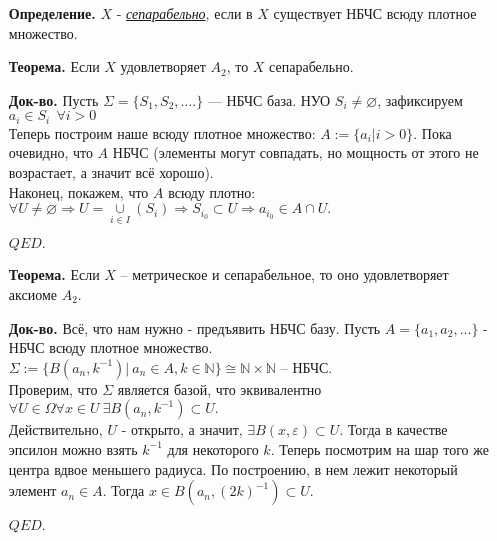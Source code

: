 \documentclass[10pt]{report}
\begin{document}
\begin{spacing}{1.5}
\begin{enumerate}
\begin{enumerate}
\end{enumerate}
\item[\textbf{Определение.}] $X$ - \emph{\underline{сепарабельно}}, если в $X$ существует НБЧС всюду плотное множество.
\item[\textbf{Теорема.}] Если $X$ удовлетворяет $A_{2}$, то $X$ сепарабельно.
\item[\textbf{Док-во.}] Пусть $\Sigma=\lbrace S_{1}, S_{2},....\rbrace $ --- НБЧС база. НУО $S_{i}\neq \varnothing$, зафиксируем $a_{i}\in S_{i}~~\forall i>0$\\
Теперь построим наше всюду плотное множество: $A:=\lbrace a_{i}|i>0\rbrace$. Пока очевидно, что $A$ НБЧС (элементы могут совпадать, но мощность от этого не возрастает, а значит всё хорошо).\\
Наконец, покажем, что $A$ всюду плотно:\\
$\forall U\neq\varnothing\Longrightarrow U=\underset{i\in I}{\cup}(S_{i})\Longrightarrow S_{i_{0}}\subset U\Rightarrow a_{i_{0}}\in A\cap U.$
\begin{flushright}
$QED.$
\end{flushright}
\item[\textbf{Теорема.}] Если $X$ -- метрическое и сепарабельное, то оно удовлетворяет аксиоме $A_{2}.$
\item[\textbf{Док-во.}] Всё, что нам нужно - предъявить НБЧС базу. Пусть $A=\lbrace a_{1}, a_{2},...\rbrace$ - НБЧС всюду плотное множество. \\
$\Sigma:=\lbrace B(a_{n}, k^{-1})|~ a_{n}\in A, k\in\mathbb{N}\rbrace\cong \mathbb{N\times N}$ -- НБЧС.\\
Проверим, что $\Sigma$ является базой, что эквивалентно $\forall U\in\Omega\forall x\in U~\exists B(a_{n}, k^{-1})\subset U. $\\
Действительно, $U$ - открыто, а значит, $\exists B(x, \varepsilon)\subset U.$ Тогда в качестве эпсилон можно взять $k^{-1}$ для некоторого $k$. Теперь посмотрим на шар того же центра вдвое меньшего радиуса. По построению, в нем лежит некоторый элемент $a_{n}\in A$. Тогда $x\in B(a_{n}, (2k)^{-1})\subset U.$
\begin{flushright}
$QED.$
\end{flushright}


\end{enumerate}


\end{spacing}
\end{document}

